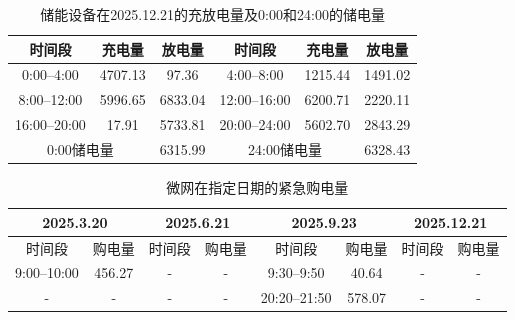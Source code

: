 \documentclass[UTF8]{ctexart}
\begin{document}
    \begin{table}[htbp]
        \centering
        \caption{储能设备在2025.12.21的充放电量及0:00和24:00的储电量}
        \label{tab:q3_battery_1221}
        \begin{tabular}{cccccc}
            \toprule
            时间段 & 充电量 & 放电量 & 时间段 & 充电量 & 放电量 \\
            \midrule
            0:00--4:00   & 4707.13 & 97.36 &
            4:00--8:00   & 1215.44 & 1491.02 \\
            8:00--12:00  & 5996.65 & 6833.04 &
            12:00--16:00 & 6200.71 & 2220.11 \\
            16:00--20:00 & 17.91 & 5733.81 &
            20:00--24:00 & 5602.70 & 2843.29 \\
            \midrule
            \multicolumn{2}{c}{0:00储电量} & 6315.99 &
            \multicolumn{2}{c}{24:00储电量} & 6328.43 \\
            \bottomrule
        \end{tabular}
    \end{table}
    \begin{table}[htbp]
        \centering
        \caption{微网在指定日期的紧急购电量}
        \label{tab:q3_emergency}
        
        \begin{tabular}{cccccccc}
            \toprule
            
            \multicolumn{2}{c}{2025.3.20} &
            \multicolumn{2}{c}{2025.6.21} &
            \multicolumn{2}{c}{2025.9.23} &
            \multicolumn{2}{c}{2025.12.21} \\
            
            \midrule
            
            时间段 & 购电量 &
            时间段 & 购电量 &
            时间段 & 购电量 &
            时间段 & 购电量 \\
            
            \midrule
            
            9:00--10:00 & 456.27 &
            - & - &
            9:30--9:50 & 40.64 &
            - & - \\
            
            - & - &
            - & - &
            20:20--21:50 & 578.07 &
            - & - \\
            
            \bottomrule 
        \end{tabular} 
    \end{table}
    
\end{document}

